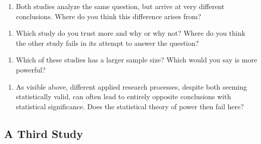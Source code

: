 \documentclass[
  letterpaper,
  DIV=11,
  numbers=noendperiod]{scrartcl}
\providecommand{\tightlist}{%
  \setlength{\itemsep}{0pt}\setlength{\parskip}{0pt}}
\begin{document}
\hfill\break
\hfill\break
\hfill\break
\hfill\break
\hfill\break
\hfill\break
\hfill\break
\hfill\break
\hfill\break
\hfill\break

\begin{enumerate}
\def\labelenumi{\arabic{enumi}.}
\setcounter{enumi}{1}
\tightlist
\item
  Both studies analyze the same question, but arrive at very different
  conclusions. Where do you think this difference arises from?
\end{enumerate}

\hfill\break
\hfill\break
\hfill\break
\hfill\break
\hfill\break
\hfill\break
\hfill\break

\begin{enumerate}
\def\labelenumi{\arabic{enumi}.}
\setcounter{enumi}{2}
\tightlist
\item
  Which study do you trust more and why or why not? Where do you think
  the other study fails in its attempt to answer the question?
\end{enumerate}

\hfill\break
\hfill\break
\hfill\break
\hfill\break
\hfill\break
\hfill\break
\hfill\break
\hfill\break

\begin{enumerate}
\def\labelenumi{\arabic{enumi}.}
\setcounter{enumi}{3}
\tightlist
\item
  Which of these studies has a larger sample size? Which would you say
  is more powerful?
\end{enumerate}

\hfill\break
\hfill\break
\hfill\break
\hfill\break
\hfill\break
\hfill\break
\hfill\break

\begin{enumerate}
\def\labelenumi{\arabic{enumi}.}
\setcounter{enumi}{4}
\tightlist
\item
  As visible above, different applied research processes, despite both
  seeming statistically valid, can often lead to entirely opposite
  conclusions with statistical significance. Does the statistical theory
  of power then fail here?
\end{enumerate}

\hfill\break
\hfill\break
\hfill\break
\hfill\break
\hfill\break
\hfill\break
\hfill\break
\hfill\break

\subsection{A Third Study}\label{a-third-study}
\end{document}

